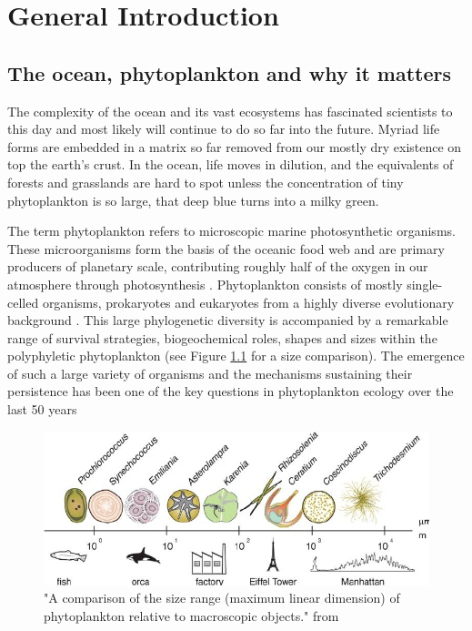 \chapter{General Introduction}

\section{The ocean, phytoplankton and why it matters}

The complexity of the ocean and its vast ecosystems has fascinated scientists to this day and most likely will continue to do so far into the future. Myriad life forms are embedded in a matrix so far removed from our mostly dry existence on top the earth’s crust. In the ocean, life moves in dilution, and the equivalents of forests and grasslands are hard to spot unless the concentration of tiny phytoplankton is so large, that deep blue turns into a milky green.

The term phytoplankton refers to microscopic marine photosynthetic organisms. These microorganisms form the basis of the oceanic food web and are primary producers of planetary scale, contributing roughly half of the oxygen in our atmosphere through photosynthesis \citep{Field2009}. Phytoplankton consists of mostly single-celled organisms, prokaryotes and eukaryotes from a highly diverse evolutionary background \citep{Falkowski2004a}. This large phylogenetic diversity is accompanied by a remarkable range of survival strategies, biogeochemical roles, shapes and sizes within the polyphyletic phytoplankton (see Figure \ref{FinkelPhySizeRange} for a size comparison). The emergence of such a large variety of organisms and the mechanisms sustaining their persistence has been one of the key questions in phytoplankton ecology over the last 50 years \citep{Hutchinson1961} %

\begin{figure}
\centering
\includegraphics[trim = 0mm 0mm 0mm 0mm, clip, width=.9\linewidth]{./Chp1-Intro/SIZEphytoComparison_FinkelEtAl2010.png}
\caption[Scheme]{{\small "A comparison of the size range (maximum linear dimension) of phytoplankton %
relative to macroscopic objects." from \cite{Finkel2010}}}
\label{FinkelPhySizeRange}
\end{figure}


